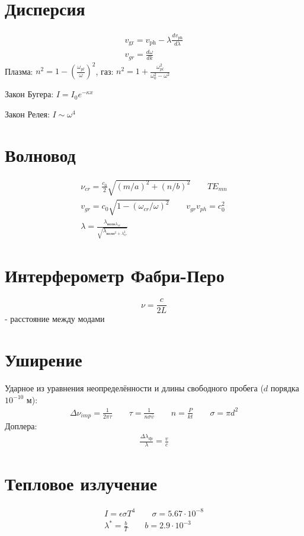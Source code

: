 \documentclass[10pt,twocolumn]{article}
\begin{document}
\section{Дисперсия}
\begin{gather*}
  v_{\text{gr}}=v_{\text{ph}}-\lambda \frac{d v_{\text{ph}}}{d\lambda}  \\ 
  v_{gr}=\frac{d\omega}{dk}
\end{gather*}
Плазма: $n^{2}=1-(\frac{\omega_{pl}}{\omega})^{2}$, газ: $n^{2}=1+\frac{\omega_{pl}^{2}}{\omega_0^{2}-\omega^{2}}$

Закон Бугера: $I=I_0 e^{-\kappa x}$

Закон Релея: $I \sim \omega^{4}$
\section{Волновод}
\begin{gather*}
  \nu_{cr}=\frac{c_0}{2}\sqrt{(m/a)^{2}+(n/b)^{2}} \qquad TE_{mn} \\ 
  v_{gr}=c_0\sqrt{1-(\omega_{cr}/\omega)^{2}} \qquad v_{gr}v_{ph}=c_0^{2} \\ 
  \lambda=\frac{\lambda_{\text{волн}\lambda_{cr}}}{\sqrt{\lambda_{\text{волн}^{2}+\lambda_{cr}^{2}}}}
\end{gather*}
\section{Интерферометр Фабри-Перо}
\[
  \nu = \frac{c}{2L}
\]
- расстояние между модами
\section{Уширение}
Ударное из уравнения неопределённости и длины свободного пробега ($d$ порядка $10^{-10}$ м): 
\begin{gather*}
  \Delta \nu_{imp}=\frac{1}{2\pi \tau} \qquad \tau=\frac{1}{n\sigma \bar{v}} \qquad n =\frac{P}{kt} \qquad \sigma=\pi d^{2}
\end{gather*}
Доплера:
\begin{gather*}
  \frac{\Delta \lambda_{dp}}{\lambda}=\frac{v}{c}
\end{gather*}
\section{Тепловое излучение}
\begin{gather*}
  I=\epsilon\sigma T^{4} \qquad \sigma=5.67 \cdot 10^{-8} \\ 
  \lambda^{*}=\frac{b}{T} \qquad b = 2.9 \cdot 10^{-3} \\ 
\end{gather*}
\end{document}

